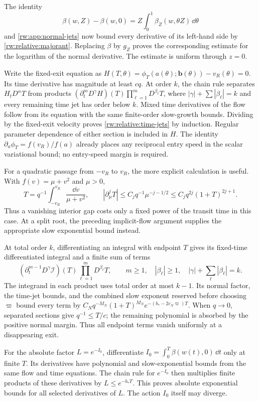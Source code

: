 The identity
\[
 \beta(w,Z)-\beta(w,0)
 =Z\int_0^1\beta_Z(w,\theta Z)\,\dd\theta
\]
and \eqref{rw:app:normal-jets} now bound every derivative of its
left-hand side by \eqref{rw:relative:majorant}. Replacing $\beta$
by $g_Z$ proves the corresponding estimate for the logarithm of the
normal derivative.  The estimate is uniform through $z=0$.

Write the fixed-exit equation as
$H(T,\theta)=\phi_T(a(\theta);\mathbf b(\theta))-v_R(\theta)=0$.
Its time derivative has magnitude at least $cq$.
At order $k$, the chain rule separates $H_tD^\alpha T$ from
products
$(\partial_t^mD^\gamma H)(T)\prod_{\ell=1}^mD^{\beta_\ell}T$,
where $|\gamma|+\sum|\beta_\ell|=k$ and every remaining time jet
has order below $k$. Mixed time derivatives of the flow follow
from its equation with the same finite-order slow-growth bounds.
Dividing by the fixed-exit velocity proves
\eqref{rw:relative:time-jets} by induction. Regular parameter
dependence of either section is included in $H$. The identity
$\partial_a\phi_T=f(v_R)/f(a)$ already places any reciprocal
entry speed in the scalar variational bound; no entry-speed margin
is required.

For a quadratic passage from $-v_R$ to $v_R$, the more explicit
calculation is useful. With $f(v)=\mu+v^2$ and $\mu>0$,
\[
 T=q^{-1}\int_{-v_R}^{v_R}\frac{\dd v}{\mu+v^2},\qquad
 |\partial_\mu^jT|\le C_jq^{-1}\mu^{-j-1/2}
 \le C_jq^{2j}(1+T)^{2j+1}.
\]
Thus a vanishing interior gap costs only a fixed power of the transit
time in this case. At a split root, the preceding implicit-flow
argument supplies the appropriate slow exponential bound instead.

At total order $k$, differentiating an integral with endpoint $T$
gives its fixed-time differentiated integral and a finite sum of terms
\begin{equation}\label{rw:app:endpoint-term}
 (\partial_t^{m-1}D^\gamma\mathcal I)(T)
       \prod_{\ell=1}^mD^{\beta_\ell}T,
 \qquad m\ge1,\quad |\beta_\ell|\ge1,\quad
 |\gamma|+\sum_\ell|\beta_\ell|=k.
\end{equation}
The integrand in each product uses total order at most $k-1$.
Its normal factor, the time-jet bounds, and the combined slow exponent
reserved before choosing $\varpi$ bound every term by
$C_Nq^{-M_N}(1+T)^{M_N}e^{-(b_*-2c_N\varpi)T}$.
When $q\to0$, separated sections give $q^{-1}\le T/c$; the
remaining polynomial is absorbed by the positive normal margin.
Thus all endpoint terms vanish uniformly at a disappearing exit.

For the absolute factor $L=e^{-I_0}$, differentiate
$I_0=\int_0^T\beta(w(t),0)\,\dd t$ only at finite $T$.
Its derivatives have polynomial and slow-exponential bounds from the
same flow and time equations. The chain rule for $e^{-I_0}$ then
multiplies finite products of these derivatives by
$L\le e^{-b_*T}$. This proves absolute exponential bounds for all
selected derivatives of $L$.  The action $I_0$ itself may diverge.

